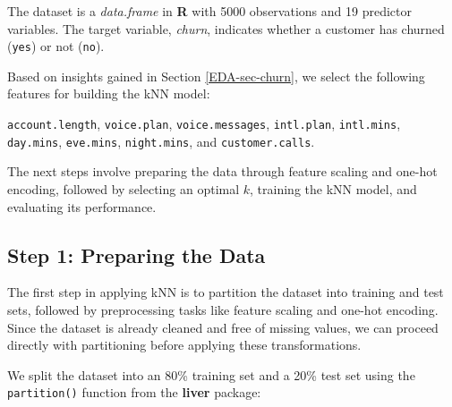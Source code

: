 \documentclass[
  11pt,
]{book}
\makeatletter
\newenvironment{Shaded}{}{}
\newcommand{\AttributeTok}[1]{#1}
\newcommand{\DecValTok}[1]{#1}
\newcommand{\FloatTok}[1]{#1}
\newcommand{\FunctionTok}[1]{#1}
\newcommand{\NormalTok}[1]{#1}
\newcommand{\OtherTok}[1]{\textcolor[rgb]{0.39,0.39,0.39}{#1}}
\newcommand{\SpecialCharTok}[1]{\textcolor[rgb]{0.39,0.39,0.39}{#1}}
\newenvironment{kframe}{%
\medskip{}
\setlength{\fboxsep}{.8em}
 \def\at@end@of@kframe{}%
 \ifinner\ifhmode%
  \def\at@end@of@kframe{\end{minipage}}%
  \begin{minipage}{\columnwidth}%
 \fi\fi%
 \def\FrameCommand##1{\hskip\@totalleftmargin \hskip-\fboxsep
 \colorbox{shadecolor}{##1}\hskip-\fboxsep
     \hskip-\linewidth \hskip-\@totalleftmargin \hskip\columnwidth}%
 \MakeFramed {\advance\hsize-\width
   \@totalleftmargin\z@ \linewidth\hsize
   \@setminipage}}%
 {\par\unskip\endMakeFramed%
 \at@end@of@kframe}
\renewenvironment{Shaded}{\begin{kframe}}{\end{kframe}}
\theoremstyle{definition}
\theoremstyle{definition}
\theoremstyle{definition}
\theoremstyle{definition}
\theoremstyle{remark}
\makeatother
\begin{document}
The dataset is a \emph{data.frame} in \textbf{R} with 5000 observations and 19 predictor variables. The target variable, \emph{churn}, indicates whether a customer has churned (\texttt{yes}) or not (\texttt{no}).

Based on insights gained in Section \ref{EDA-sec-churn}, we select the following features for building the kNN model:

\texttt{account.length}, \texttt{voice.plan}, \texttt{voice.messages}, \texttt{intl.plan}, \texttt{intl.mins}, \texttt{day.mins}, \texttt{eve.mins}, \texttt{night.mins}, and \texttt{customer.calls}.

The next steps involve preparing the data through feature scaling and one-hot encoding, followed by selecting an optimal \(k\), training the kNN model, and evaluating its performance.

\subsection{Step 1: Preparing the Data}\label{step-1-preparing-the-data}

The first step in applying kNN is to partition the dataset into training and test sets, followed by preprocessing tasks like feature scaling and one-hot encoding. Since the dataset is already cleaned and free of missing values, we can proceed directly with partitioning before applying these transformations.

We split the dataset into an 80\% training set and a 20\% test set using the \texttt{partition()} function from the \textbf{liver} package:

\begin{Shaded}
\end{Shaded}
\end{document}
